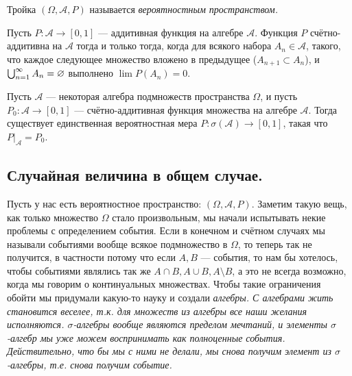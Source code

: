 \begin{definition}
    Тройка $\left( \Omega, \mathcal{A}, P \right)$ называется \it{вероятностным пространством}.
\end{definition}
\begin{proposal}
    Пусть $P \colon \mathcal{A} \to [0, 1]$ --- аддитивная функция на алгебре $\mathcal{A}$. Функция $P$ счётно-аддитивна
    на $\mathcal{A}$ тогда и только тогда, когда для всякого набора $A_n \in \mathcal{A}$, такого, что каждое следующее
    множество вложено в предыдущее ($A_{n + 1} \subset A_n$), и $\bigcup_{n=1}^{\infty} A_n = \varnothing$ выполнено
    $\lim P(A_n) = 0$.
\end{proposal}
\begin{theorem}
    Пусть $\mathcal{A}$ --- некоторая алгебра подмножеств пространства $\Omega$, и пусть $P_0 \colon \mathcal{A} \to
    [0, 1]$ --- счётно-аддитивная функция множества на алгебре $\mathcal{A}$. Тогда существует единственная вероятностная мера
    $P \colon \sigma(\mathcal{A}) \to [0, 1]$, такая что $P\Big|_{\mathcal{A}} = P_0$.
\end{theorem}

\subsection{Случайная величина в общем случае.}
Пусть у нас есть вероятностное пространство: $(\Omega, \mathcal{A}, P)$. Заметим такую вещь, как только множество
$\Omega$ стало произвольным, мы начали испытывать некие проблемы с определением события. Если в конечном и счётном
случаях мы называли событиями вообще всякое подмножество в $\Omega$, то теперь так не получится, в частности потому что
если $A, B$ --- события, то нам бы хотелось, чтобы событиями являлись так же $A \cap B, A \cup B, A \setminus B$, а это
не всегда возможно, когда мы говорим о континуальных множествах. Чтобы такие ограничения обойти мы придумали какую-то науку
и создали \it{алгебры}. С алгебрами жить становится веселее, т.к. для множеств из алгебры все наши желания исполняются.
\it{$\sigma$-алгебры} вообще являются пределом мечтаний, и элементы $\sigma$-алгебр мы уже можем воспринимать как полноценные
события. Действительно, что бы мы с ними не делали, мы снова получим элемент из $\sigma$-алгебры, т.е. снова получим событие.

